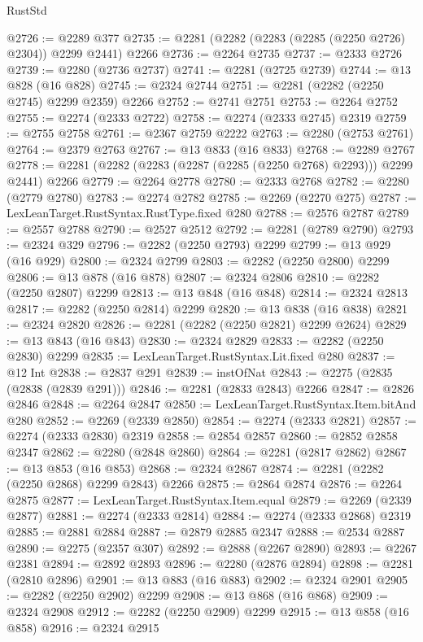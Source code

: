 \begin{lexlean}{RustStd}
\begin{coremodule}
@2726 := @2289 @377
@2735 := @2281 (@2282 (@2283 (@2285 (@2250 @2726) @2304)) @2299 @2441) @2266
@2736 := @2264 @2735
@2737 := @2333 @2726
@2739 := @2280 (@2736 @2737)
@2741 := @2281 (@2725 @2739)
@2744 := @13 @828 (@16 @828)
@2745 := @2324 @2744
@2751 := @2281 (@2282 (@2250 @2745) @2299 @2359) @2266
@2752 := @2741 @2751
@2753 := @2264 @2752
@2755 := @2274 (@2333 @2722)
@2758 := @2274 (@2333 @2745) @2319
@2759 := @2755 @2758
@2761 := @2367 @2759 @2222
@2763 := @2280 (@2753 @2761)
@2764 := @2379 @2763
@2767 := @13 @833 (@16 @833)
@2768 := @2289 @2767
@2778 := @2281 (@2282 (@2283 (@2287 (@2285 (@2250 @2768) @2293))) @2299 @2441) @2266
@2779 := @2264 @2778
@2780 := @2333 @2768
@2782 := @2280 (@2779 @2780)
@2783 := @2274 @2782
@2785 := @2269 (@2270 @275)
@2787 := LexLeanTarget.RustSyntax.RustType.fixed @280
@2788 := @2576 @2787
@2789 := @2557 @2788
@2790 := @2527 @2512
@2792 := @2281 (@2789 @2790)
@2793 := @2324 @329
@2796 := @2282 (@2250 @2793) @2299
@2799 := @13 @929 (@16 @929)
@2800 := @2324 @2799
@2803 := @2282 (@2250 @2800) @2299
@2806 := @13 @878 (@16 @878)
@2807 := @2324 @2806
@2810 := @2282 (@2250 @2807) @2299
@2813 := @13 @848 (@16 @848)
@2814 := @2324 @2813
@2817 := @2282 (@2250 @2814) @2299
@2820 := @13 @838 (@16 @838)
@2821 := @2324 @2820
@2826 := @2281 (@2282 (@2250 @2821) @2299 @2624)
@2829 := @13 @843 (@16 @843)
@2830 := @2324 @2829
@2833 := @2282 (@2250 @2830) @2299
@2835 := LexLeanTarget.RustSyntax.Lit.fixed @280
@2837 := @12 Int
@2838 := @2837 @291
@2839 := instOfNat
@2843 := @2275 (@2835 (@2838 (@2839 @291)))
@2846 := @2281 (@2833 @2843) @2266
@2847 := @2826 @2846
@2848 := @2264 @2847
@2850 := LexLeanTarget.RustSyntax.Item.bitAnd @280
@2852 := @2269 (@2339 @2850)
@2854 := @2274 (@2333 @2821)
@2857 := @2274 (@2333 @2830) @2319
@2858 := @2854 @2857
@2860 := @2852 @2858 @2347
@2862 := @2280 (@2848 @2860)
@2864 := @2281 (@2817 @2862)
@2867 := @13 @853 (@16 @853)
@2868 := @2324 @2867
@2874 := @2281 (@2282 (@2250 @2868) @2299 @2843) @2266
@2875 := @2864 @2874
@2876 := @2264 @2875
@2877 := LexLeanTarget.RustSyntax.Item.equal
@2879 := @2269 (@2339 @2877)
@2881 := @2274 (@2333 @2814)
@2884 := @2274 (@2333 @2868) @2319
@2885 := @2881 @2884
@2887 := @2879 @2885 @2347
@2888 := @2534 @2887
@2890 := @2275 (@2357 @307)
@2892 := @2888 (@2267 @2890)
@2893 := @2267 @2381
@2894 := @2892 @2893
@2896 := @2280 (@2876 @2894)
@2898 := @2281 (@2810 @2896)
@2901 := @13 @883 (@16 @883)
@2902 := @2324 @2901
@2905 := @2282 (@2250 @2902) @2299
@2908 := @13 @868 (@16 @868)
@2909 := @2324 @2908
@2912 := @2282 (@2250 @2909) @2299
@2915 := @13 @858 (@16 @858)
@2916 := @2324 @2915

\end{coremodule}
\end{lexlean}
